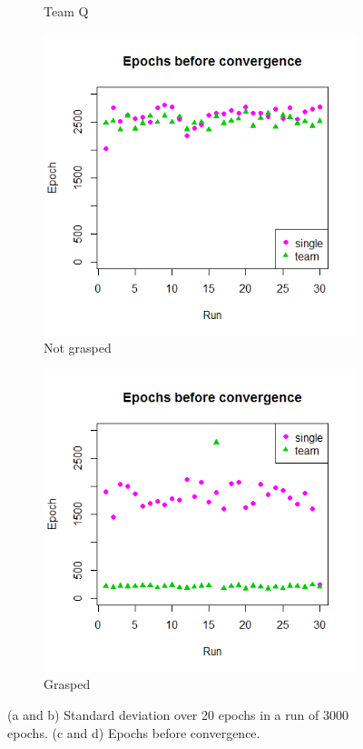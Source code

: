 \begin{figure}[ht]
\begin{subfigure}{0.48\textwidth}
		\caption{Team Q}
		\label{3b}		
	\end{subfigure}
	\begin{subfigure}{.48\textwidth}
		\centering
		\includegraphics[width=\textwidth]{images/Convergence_notgrabbed.png}
		\caption{Not grasped}
		\label{3c}		
	\end{subfigure}
	\begin{subfigure}{0.48\textwidth}
		\centering
		\includegraphics[width=\textwidth]{images/Convergence_grabbed.png}
		\caption{Grasped}
		\label{3d}		
	\end{subfigure}
	\caption{(a and b) Standard deviation over 20 epochs in a run of 3000 epochs. (c and d) Epochs before convergence.}
	\label{fig:Results3}
\end{figure}

